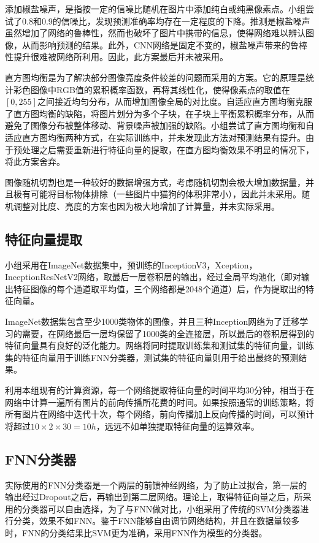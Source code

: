 \documentclass[10.5pt,twocolumn]{jbuaa}
\begin{document}
添加椒盐噪声，是指按一定的信噪比随机在图片中添加纯白或纯黑像素点。小组尝试了0.8和0.9的信噪比，发现预测准确率均存在一定程度的下降。推测是椒盐噪声虽然增加了网络的鲁棒性，然而也破坏了图片中携带的信息，使得网络难以辨认图像，从而影响预测的结果。此外，CNN网络是固定不变的，椒盐噪声带来的鲁棒性提升很难被网络所利用。因此，此方案最后并未被采用。

直方图均衡是为了解决部分图像亮度条件较差的问题而采用的方案。它的原理是统计彩色图像中RGB值的累积概率函数，再将其线性化，使得像素点的取值在$[0,255]$之间接近均匀分布，从而增加图像全局的对比度。自适应直方图均衡克服了直方图均衡的缺陷，将图片划分为多个子块，在子块上平衡累积概率分布，从而避免了图像分布被整体移动、背景噪声被加强的缺陷。小组尝试了直方图均衡和自适应直方图均衡两种方式，在实际训练中，并未发现此方法对预测结果有提升。由于预处理之后需要重新进行特征向量的提取，在直方图均衡效果不明显的情况下，将此方案舍弃。

图像随机切割也是一种较好的数据增强方式，考虑随机切割会极大增加数据量，并且极有可能将目标物体排除（一些图片中猫狗的体积非常小），因此并未采用。随机调整对比度、亮度的方案也因为极大地增加了计算量，并未实际采用。
\subsection{特征向量提取}
小组采用在ImageNet数据集中，预训练的InceptionV3，Xception，InceptionResNetV2网络，取最后一层卷积层的输出，经过全局平均池化（即对输出特征图像的每个通道取平均值，三个网络都是2048个通道）后，作为提取出的特征向量。

ImageNet数据集包含至少1000类物体的图像，并且三种Inception网络为了迁移学习的需要，在网络最后一层均保留了1000类的全连接层，所以最后的卷积层得到的特征向量具有良好的泛化能力。网络将同时提取训练集和测试集的特征向量，训练集的特征向量用于训练FNN分类器，测试集的特征向量则用于给出最终的预测结果。

利用本组现有的计算资源，每一个网络提取特征向量的时间平均30分钟，相当于在网络中计算一遍所有图片的前向传播所花费的时间。如果按照通常的训练策略，将所有图片在网络中迭代十次，每个网络，前向传播加上反向传播的时间，可以预计将超过$10\times2\times30=10h$，远远不如单独提取特征向量的运算效率。
\subsection{FNN分类器}
实际使用的FNN分类器是一个两层的前馈神经网络，为了防止过拟合，第一层的输出经过Dropout之后，再输出到第二层网络。理论上，取得特征向量之后，所采用的分类器可以自由选择，为了与FNN做对比，小组采用了传统的SVM分类器进行分类，效果不如FNN。鉴于FNN能够自由调节网络结构，并且在数据量较多时，FNN的分类结果比SVM更为准确，采用FNN作为模型的分类器。
\end{document}
